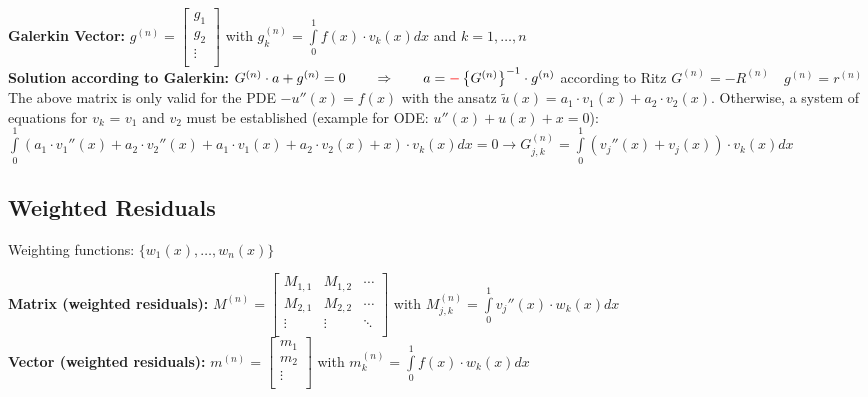 \textbf{Galerkin Vector: }
$g^{(n)}=\begin{bmatrix}
	g_1\\
	g_2\\
	\vdots\\
\end{bmatrix}$ \quad with \quad $g_{k}^{(n)}=\int\limits_{0}^{1}{f(x)\cdot v_k(x) dx}$
\quad and \quad $k = 1,\ldots,n$\\

\textbf{Solution according to Galerkin:} $G^{(n)}\cdot a+g^{(n)}=0\qquad \Rightarrow
\qquad a=\textcolor{red}{\mathbf{-}}\left\{G^{(n)}\right\}^{-1}\cdot g^{(n)}$ \quad according to Ritz $G^{(n)} = -R^{(n)} \quad g^{(n)} = r^{(n)}$\\

The above matrix is only valid for the PDE $-u''(x) = f(x)$ with the ansatz
$\tilde{u}(x) = a_1 \cdot v_1(x) + a_2 \cdot v_2(x)$.
Otherwise, a system of equations for $v_k$ = $v_1$ and $v_2$ must be established
(example for ODE: $u''(x) + u(x) + x = 0$):\\

$\int\limits_{0}^{1}{(a_1 \cdot v_1''(x) + a_2 \cdot v_2''(x) + a_1 \cdot
v_1(x) + a_2 \cdot v_2(x) + x) \cdot v_k(x) dx} = 0
\rightarrow G_{j,k}^{(n)}=\int\limits_{0}^{1}(v_j''(x) + v_j(x))\cdot v_k(x) dx$


\subsection{Weighted Residuals}
Weighting functions: $\{w_1(x),\ldots,w_n(x)\}$

\textbf{Matrix (weighted residuals): }
$M^{(n)}=\begin{bmatrix}
	M_{1,1}& M_{1,2}&\cdots\\
	M_{2,1}& M_{2,2}&\cdots\\
	\vdots & \vdots &\ddots\\
\end{bmatrix}$ \qquad with \qquad $M_{j,k}^{(n)}=\int\limits_{0}^{1}{v_j''(x)\cdot w_k(x) dx}$\\
\textbf{Vector (weighted residuals): }
$m^{(n)}=\begin{bmatrix}
	m_1\\
	m_2\\
	\vdots\\
\end{bmatrix}$ \qquad with \qquad $m_{k}^{(n)}=\int\limits_{0}^{1}{f(x)\cdot w_k(x) dx}$\\

